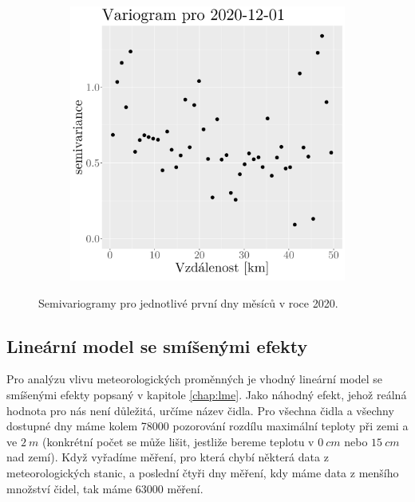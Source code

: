 \begin{figure}
\begin{subfigure}{0.30\textwidth}
		\caption{}
		\label{fig:variogram11}
	\end{subfigure}
\hfill
	\begin{subfigure}{0.30\textwidth}
		\includegraphics[width=\textwidth]{img/ch2/variograms/variogram_max15cm12.png}
		\caption{}
		\label{fig:variogram12}
	\end{subfigure}
	\caption{Semivariogramy pro jednotlivé první dny měsíců v roce 2020.}
	\label{fig:variograms}
\end{figure}

\subsection{Lineární model se smíšenými efekty}
Pro analýzu vlivu meteorologických proměnných je vhodný lineární model se smíšenými efekty popsaný v kapitole \ref{chap:lme}. Jako náhodný efekt, jehož reálná hodnota pro nás není důležitá, určíme název čidla. Pro všechna čidla a všechny dostupné dny máme kolem 78000 pozorování rozdílu maximální teploty při zemi a ve $\SI{2}{m}$ (konkrétní počet se může lišit, jestliže bereme teplotu v $\SI{0}{cm}$ nebo $\SI{15}{cm}$ nad zemí). Když vyřadíme měření, pro která chybí některá data z meteorologických stanic, a poslední čtyři dny měření, kdy máme data z menšího množství čidel, tak máme 63000 měření.

